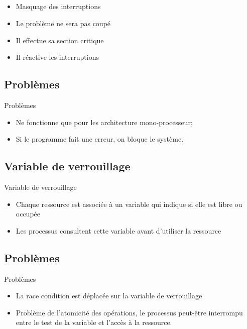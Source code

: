 \subsection{\subsectitle}
\begin{frame}{\sectitle}
\begin{block}{\subsectitle}
\begin{itemize}
\item Masquage des interruptions
\item Le problème ne sera pas coupé
\item Il effectue sa section critique
\item Il réactive les interruptions
\end{itemize}
\end{block}

\def\subsectitle{Problèmes}
\subsection{\subsectitle}
\begin{block}{\subsectitle}
\begin{itemize}
\item Ne fonctionne que pour les architecture mono-processeur;
\item Si le programme fait une erreur, on bloque le système.
\end{itemize}
\end{block}
\end{frame}

\begin{frame}{\sectitle}
    \def\subsectitle{Variable de verrouillage}
    \subsection{\subsectitle}
    \begin{block} {\subsectitle}
        \begin{itemize}
            \item Chaque ressource est associée à un variable qui indique si
                elle est libre ou occupée
            \item Les processus consultent cette variable avant d'utiliser la
                ressource
        \end{itemize}
    \end{block} 

    \def\subsectitle{Problèmes}
    \subsection{\subsectitle}
    \begin{block}{\subsectitle}
        \begin{itemize}
            \item La race condition est déplacée sur la variable de verrouillage
            \item Problème de l'atomicité des opérations, le processus peut-être
                interrompu entre le test de la variable et l'accès à la
                ressource.
        \end{itemize}
    \end{block}
\end{frame}


